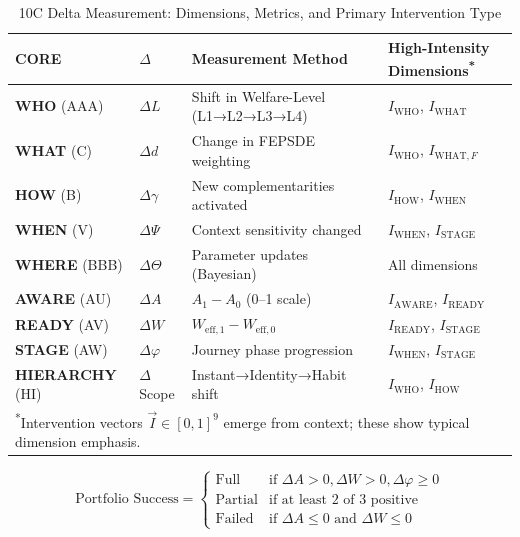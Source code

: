 \begin{table}[htbp]
\centering
\caption{10C Delta Measurement: Dimensions, Metrics, and Primary Intervention Type}
\label{tab:hhh-9c-delta-measurement}
\renewcommand{\arraystretch}{1.4}
\footnotesize
\begin{tabular}{@{}llp{4.5cm}l@{}}
\toprule
\textbf{CORE} & \textbf{$\Delta$} & \textbf{Measurement Method} & \textbf{High-Intensity Dimensions}\textsuperscript{*} \\
\midrule
\textbf{WHO} (AAA) & $\Delta L$ & Shift in Welfare-Level (L1→L2→L3→L4) & $I_{\text{WHO}}$, $I_{\text{WHAT}}$ \\
\textbf{WHAT} (C) & $\Delta d$ & Change in FEPSDE weighting & $I_{\text{WHO}}$, $I_{\text{WHAT},F}$ \\
\textbf{HOW} (B) & $\Delta\gamma$ & New complementarities activated & $I_{\text{HOW}}$, $I_{\text{WHEN}}$ \\
\textbf{WHEN} (V) & $\Delta\Psi$ & Context sensitivity changed & $I_{\text{WHEN}}$, $I_{\text{STAGE}}$ \\
\textbf{WHERE} (BBB) & $\Delta\Theta$ & Parameter updates (Bayesian) & All dimensions \\
\textbf{AWARE} (AU) & $\Delta A$ & $A_1 - A_0$ (0--1 scale) & $I_{\text{AWARE}}$, $I_{\text{READY}}$ \\
\textbf{READY} (AV) & $\Delta W$ & $W_{\text{eff},1} - W_{\text{eff},0}$ & $I_{\text{READY}}$, $I_{\text{STAGE}}$ \\
\textbf{STAGE} (AW) & $\Delta\varphi$ & Journey phase progression & $I_{\text{WHEN}}$, $I_{\text{STAGE}}$ \\
\textbf{HIERARCHY} (HI) & $\Delta$Scope & Instant→Identity→Habit shift & $I_{\text{WHO}}$, $I_{\text{HOW}}$ \\
\bottomrule
\multicolumn{4}{l}{\textsuperscript{*}\footnotesize Intervention vectors $\vec{I} \in [0,1]^9$ emerge from context; these show typical dimension emphasis.}
\end{tabular}
\end{table}

\begin{tcolorbox}[colback=gray!5!white, colframe=gray!75!black,
    title=Definition HHH-D0b: Portfolio Success Criteria]
\begin{equation}
\text{Portfolio Success} = \begin{cases}
\text{Full} & \text{if } \Delta A > 0, \Delta W > 0, \Delta\varphi \geq 0 \\
\text{Partial} & \text{if at least 2 of 3 positive} \\
\text{Failed} & \text{if } \Delta A \leq 0 \text{ and } \Delta W \leq 0
\end{cases}
\end{equation}
\end{tcolorbox}



